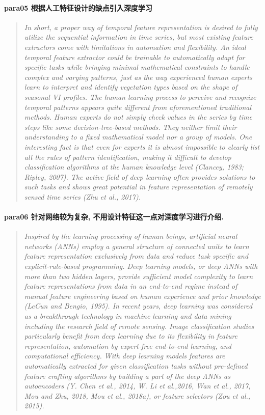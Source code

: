 \paragraph*{para05
    \textcolor[RGB]{17, 205, 29}{根据人工特征设计的缺点引入深度学习}}
\begin{quotation}
    \itshape
    In short, a proper way of temporal feature representation is desired to fully utilize the sequential information in time series, but most existing feature extractors come with limitations in automation and flexibility. An ideal temporal feature extractor could be trainable to automatically adapt for specific tasks while bringing minimal mathematical constraints to handle complex and varying patterns, just as the way experienced human experts learn to interpret and identify vegetation types based on the shape of seasonal VI profiles. The human learning process to perceive and recognize temporal patterns appears quite different from aforementioned traditional methods. Human experts do not simply check values in the series by time steps like some decision-tree-based methods. They neither limit their understanding to a fixed mathematical model nor a group of models. One interesting fact is that even for experts it is almost impossible to clearly list all the rules of pattern identification, making it difficult to develop classification algorithms at the human knowledge level (Clancey, 1983; Ripley, 2007). The active field of deep learning often provides solutions to such tasks and shows great potential in feature representation of remotely sensed time series (Zhu et al., 2017).
\end{quotation}

\paragraph*{para06
    \textcolor[RGB]{17, 205, 29}{针对网络较为复杂, 不用设计特征这一点对深度学习进行介绍. }}
\begin{quotation}
    \itshape
    Inspired by the learning processing of human beings, artificial neural networks (ANNs) employ a general structure of connected units to learn feature representation exclusively from data and reduce task specific and explicit-rule-based programming. Deep learning models, or deep ANNs with more than two hidden layers, provide sufficient model complexity to learn feature representations from data in an  end-to-end regime instead of manual feature engineering based on human experience and prior knowledge (LeCun and Bengio, 1995). In recent years, deep learning was considered as a breakthrough technology in machine learning and data mining including the research field of remote sensing. Image classification studies particularly benefit from deep learning due to its flexibility in feature representation, automation by expert-free end-to-end learning, and computational efficiency. With deep learning models features are automatically extracted for given classification tasks without pre-defined feature crafting algorithms by building a part of the deep ANNs as autoencoders (Y. Chen et al., 2014, W. Li et al.,2016, Wan et al., 2017, Mou and Zhu, 2018, Mou et al., 2018a), or feature selectors (Zou et al., 2015).
\end{quotation}

